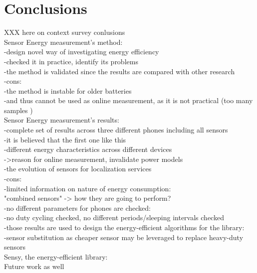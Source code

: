 \section{Conclusions}
\label{s:conc}
XXX here on context survey conlusions \\

Sensor Energy measurement's method:\\
	-design novel way of investigating energy efficiency\\
	-checked it in practice, identify its problems\\
	-the method is validated since the results are compared with other research\\
	-cons:\\
		-the method is instable for older batteries \\
			-and thus cannot be used as online measurement, as it is not practical (too many samples )\\
	
	
Sensor Energy measurement's results:\\
	-complete set of results across three different phones including all sensors\\
		-it is believed that the first one like this\\
	-different energy characteristics across different devices\\
		->reason for online measurement, invalidate power models\\
	-the evolution of sensors for localization services\\
	-cons:\\
		-limited information on nature of energy consumption:\\
			"combined sensors" -> how they are going to perform?\\
			-no different parameters for phones are checked:\\
				-no duty cycling checked, no different periods/sleeping intervals checked\\
	-those results are used to design the energy-efficient algorithms for the library:\\
		-sensor substitution as cheaper sensor may be leveraged to replace heavy-duty sensors\\
	
Sensy, the energy-efficient library:\\






Future work as well\\
